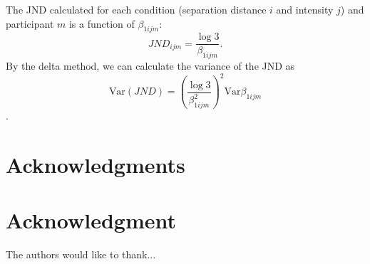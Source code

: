 The JND calculated for each condition (separation distance $i$ and intensity $j$) and participant $m$ is a function of $\beta_{1ijm}$: $$JND_{ijm} = \frac{\log 3}{\beta_{1ijm}}.$$ 
By the delta method, we can calculate the variance of the JND as $$\text{Var} (JND) = \left(\frac{\log 3}{\beta_{1ijm}^2}\right)^2 \text{Var}\beta_{1ijm}$$. 



\ifCLASSOPTIONcompsoc
\section*{Acknowledgments}
\else
\section*{Acknowledgment}
\fi


The authors would like to thank...











% 

